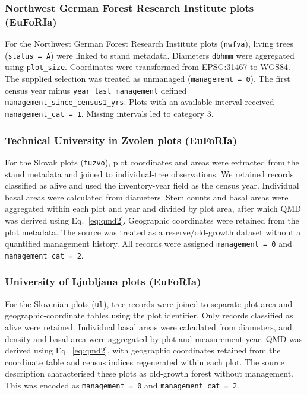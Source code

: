 \documentclass{myreport}
\begin{document}
\subsubsection{Northwest German Forest Research Institute plots (EuFoRIa)}
For the Northwest German Forest Research Institute plots (\texttt{nwfva}), living trees (\texttt{status = A}) were linked to stand metadata. Diameters \texttt{dbhmm} were aggregated using \texttt{plot\_size}. Coordinates were transformed from EPSG:31467 to WGS84. The supplied selection was treated as unmanaged (\texttt{management = 0}). The first census year minus \texttt{year\_last\_management} defined \texttt{management\_since\_census1\_yrs}. Plots with an available interval received \texttt{management\_cat = 1}. Missing intervals led to category 3.

% 

\subsubsection{Technical University in Zvolen plots (EuFoRIa)}
For the Slovak plots (\texttt{tuzvo}), plot coordinates and areas were extracted from the stand metadata and joined to individual-tree observations. We retained records classified as alive and used the inventory-year field as the census year. Individual basal areas were calculated from diameters. Stem counts and basal areas were aggregated within each plot and year and divided by plot area, after which QMD was derived using Eq.~\ref{eq:qmd2}. Geographic coordinates were retained from the plot metadata. The source was treated as a reserve/old-growth dataset without a quantified management history. All records were assigned \texttt{management = 0} and \texttt{management\_cat = 2}. 

% 

\subsubsection{University of Ljubljana plots (EuFoRIa)}
For the Slovenian plots (\texttt{ul}), tree records were joined to separate plot-area and geographic-coordinate tables using the plot identifier. Only records classified as alive were retained. Individual basal areas were calculated from diameters, and density and basal area were aggregated by plot and measurement year. QMD was derived using Eq.~\ref{eq:qmd2}, with geographic coordinates retained from the coordinate table and census indices regenerated within each plot. The source description characterised these plots as old-growth forest without management. This was encoded as \texttt{management = 0} and \texttt{management\_cat = 2}.
\end{document}
